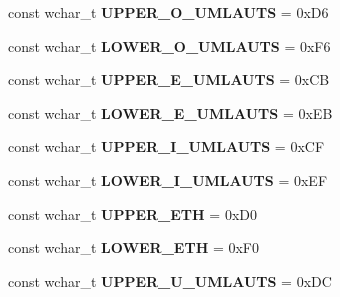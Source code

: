 \begin{DoxyCompactItemize}
\item 
\hypertarget{group___indexing_ga45ff4cb125ebcd7bdfb655f39436b702}{const wchar\-\_\-t {\bfseries U\-P\-P\-E\-R\-\_\-\-O\-\_\-\-U\-M\-L\-A\-U\-T\-S} = 0x\-D6}\label{group___indexing_ga45ff4cb125ebcd7bdfb655f39436b702}

\item 
\hypertarget{group___indexing_gad91f23ad1dbbbfec17f57ef925297970}{const wchar\-\_\-t {\bfseries L\-O\-W\-E\-R\-\_\-\-O\-\_\-\-U\-M\-L\-A\-U\-T\-S} = 0x\-F6}\label{group___indexing_gad91f23ad1dbbbfec17f57ef925297970}

\item 
\hypertarget{group___indexing_ga7624ce64ada9e757601aa79e804ef803}{const wchar\-\_\-t {\bfseries U\-P\-P\-E\-R\-\_\-\-E\-\_\-\-U\-M\-L\-A\-U\-T\-S} = 0x\-C\-B}\label{group___indexing_ga7624ce64ada9e757601aa79e804ef803}

\item 
\hypertarget{group___indexing_gaff1d3c02db3883477abf74eead9c14b0}{const wchar\-\_\-t {\bfseries L\-O\-W\-E\-R\-\_\-\-E\-\_\-\-U\-M\-L\-A\-U\-T\-S} = 0x\-E\-B}\label{group___indexing_gaff1d3c02db3883477abf74eead9c14b0}

\item 
\hypertarget{group___indexing_ga0a620569e2cf93084d20418c9aa894db}{const wchar\-\_\-t {\bfseries U\-P\-P\-E\-R\-\_\-\-I\-\_\-\-U\-M\-L\-A\-U\-T\-S} = 0x\-C\-F}\label{group___indexing_ga0a620569e2cf93084d20418c9aa894db}

\item 
\hypertarget{group___indexing_gac15a4b365a989e2c2c293fb6eedd84cf}{const wchar\-\_\-t {\bfseries L\-O\-W\-E\-R\-\_\-\-I\-\_\-\-U\-M\-L\-A\-U\-T\-S} = 0x\-E\-F}\label{group___indexing_gac15a4b365a989e2c2c293fb6eedd84cf}

\item 
\hypertarget{group___indexing_gabadd93d486736ae58738aaa0451a4fb2}{const wchar\-\_\-t {\bfseries U\-P\-P\-E\-R\-\_\-\-E\-T\-H} = 0x\-D0}\label{group___indexing_gabadd93d486736ae58738aaa0451a4fb2}

\item 
\hypertarget{group___indexing_ga3f93efe1f9bf5cb826df68c106565881}{const wchar\-\_\-t {\bfseries L\-O\-W\-E\-R\-\_\-\-E\-T\-H} = 0x\-F0}\label{group___indexing_ga3f93efe1f9bf5cb826df68c106565881}

\item 
\hypertarget{group___indexing_gaae9d0af66284aa09ada195ccd40d960c}{const wchar\-\_\-t {\bfseries U\-P\-P\-E\-R\-\_\-\-U\-\_\-\-U\-M\-L\-A\-U\-T\-S} = 0x\-D\-C}\label{group___indexing_gaae9d0af66284aa09ada195ccd40d960c}


\end{DoxyCompactItemize}
